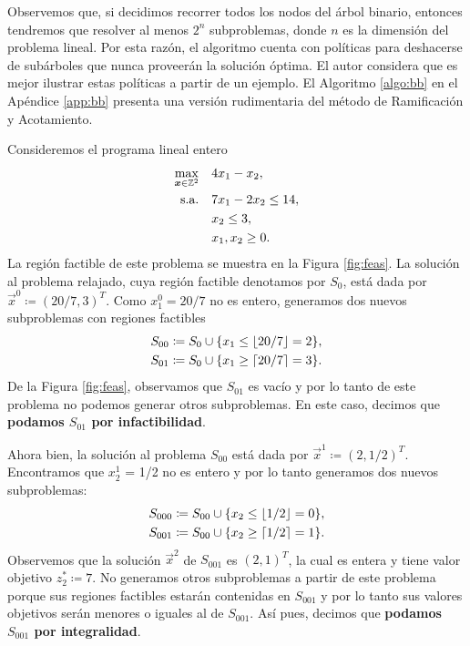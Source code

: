 Observemos que, si decidimos recorrer todos los nodos del árbol binario, entonces tendremos que
resolver al menos $2^n$ subproblemas, donde $n$ es la dimensión del problema lineal. Por esta razón,
el algoritmo cuenta con políticas para deshacerse de subárboles que nunca proveerán la solución
óptima. El autor considera que es mejor ilustrar estas políticas a partir de un ejemplo. El
Algoritmo \ref{algo:bb} en el Apéndice \ref{app:bb} presenta una versión rudimentaria del método de
Ramificación y Acotamiento.

\begin{example}
	\label{ex:ilp}
	Consideremos el programa lineal entero
	\begin{align*}
		\max_{\boldsymbol{x} \in \mathbb{Z}^2} \quad
			& 4x_1 - x_2, \\
			\text{s.a.} \quad
			& 7x_1 - 2x_2 \leq 14, \\
			& x_2 \leq 3, \\
			& x_1, x_2 \geq 0.
	\end{align*}
	La región factible de este problema se muestra en la Figura \ref{fig:feas}. La solución al problema
	relajado, cuya región factible denotamos por $S_0$, está dada por $\vec{x}^0 \coloneq (20/7,
	3)^T$. Como $x_1^0 = 20/7$ no es entero, generamos dos nuevos subproblemas con regiones
	factibles
	\begin{align*}
		S_{00} &\coloneq S_0 \cup \lbrace  x_1 \leq \lfloor 20/7 \rfloor = 2 \rbrace, \\
		S_{01} &\coloneq S_0 \cup \lbrace  x_1 \geq \lceil 20/7 \rceil = 3 \rbrace.
	\end{align*}
	De la Figura \ref{fig:feas}, observamos que $S_{01}$ es vacío y por lo tanto de este problema no
	podemos generar otros subproblemas. En este caso, decimos que \textbf{podamos $S_{01}$ por
	infactibilidad}.

	Ahora bien, la solución al problema $S_{00}$ está dada por $\vec{x}^1 \coloneq (2, 1/2)^T$.
	Encontramos que $x_2^1$ = 1/2 no es entero y por lo tanto generamos dos nuevos subproblemas:
	\begin{align*}
		S_{000} &\coloneq S_{00} \cup \lbrace  x_2 \leq \lfloor 1/2 \rfloor = 0 \rbrace, \\
		S_{001} &\coloneq S_{00} \cup \lbrace  x_2 \geq \lceil 1/2 \rceil = 1 \rbrace.
	\end{align*}
	Observemos que la solución $\vec{x}^2$ de $S_{001}$ es $(2, 1)^T$, la cual es entera y tiene valor
	objetivo $z_2^* \coloneq 7$. No generamos otros subproblemas a partir de este problema porque
	sus regiones factibles estarán contenidas en $S_{001}$ y por lo tanto sus valores objetivos
	serán menores o iguales al de $S_{001}$. Así pues, decimos que \textbf{podamos $S_{001}$ por
	integralidad}.


\end{example}
